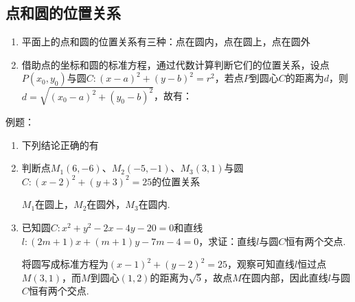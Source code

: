 \subsection*{点和圆的位置关系}
\begin{enumerate}
    \item 平面上的点和圆的位置关系有三种：点在圆内，点在圆上，点在圆外
    \item 借助点的坐标和圆的标准方程，通过代数计算判断它们的位置关系，设点$P(x_0, y_0)$与圆$C:(x-a)^2 + (y-b)^2 = r^2$，若点$P$到圆心$C$的距离为$d$，则$d = \sqrt{(x_0-a)^2 + (y_0-b)^2}$，故有：
\end{enumerate}
例题：
\begin{enumerate}
    \item 下列结论正确的有
    \item 判断点$M_1(6, -6)$、$M_2(-5, -1)$、$M_3(3, 1)$与圆$C: (x-2)^2+(y+3)^2 = 25$的位置关系
    \begin{jieda}
        $M_1$在圆上，$M_2$在圆外，$M_3$在圆内.
    \end{jieda}
    \item 已知圆$C: x^2+y^2-2x-4y-20 = 0$和直线$l: (2m+1)x + (m+1)y-7m-4 = 0$，求证：直线$l$与圆$C$恒有两个交点.
    \begin{jieda}
        将圆写成标准方程为$(x-1)^2+(y-2)^2 = 25$，观察可知直线$l$恒过点$M(3, 1)$，而$M$到圆心$(1, 2)$的距离为$\sqrt{5}$，故点$M$在圆内部，因此直线$l$与圆$C$恒有两个交点.
    \end{jieda}
\end{enumerate}
